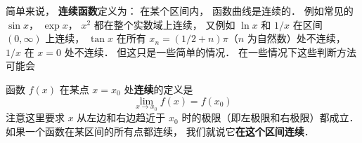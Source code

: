 

简单来说， \textbf{连续函数}定义为： 在某个区间内， 函数曲线是连续的． 例如常见的 $\sin x$， $\exp x$， $x^2$ 都在整个实数域上连续， 又例如 $\ln x$ 和 $1/x$ 在区间 $(0, \infty)$ 上连续， $\tan x$ 在所有 $x_n = (1/2 + n)\pi$（$n$ 为自然数）处不连续， $1/x$ 在 $x = 0$ 处不连续． 但这只是一些简单的情况． 在一些情况下这些判断方法可能会

函数 $f(x)$ 在某点 $x = x_0$ 处\textbf{连续}的定义是
\begin{equation}
\lim_{x \to x_0} f(x) = f(x_0)
\end{equation}
注意这里要求 $x$ 从左边和右边趋近于 $x_0$ 时的极限（即左极限和右极限）都成立． 如果一个函数在某区间的所有点都连续， 我们就说它\textbf{在这个区间连续}．

